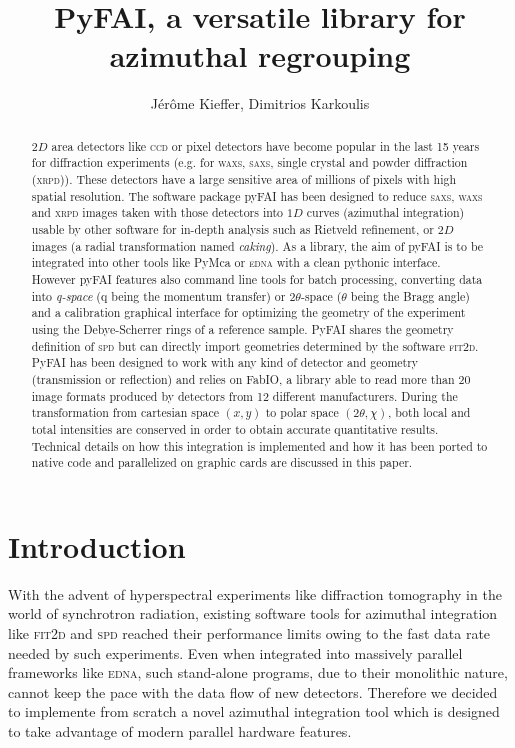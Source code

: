 \documentclass[a4paper]{jpconf}
\begin{document}
\title{PyFAI, a versatile library for azimuthal regrouping}

\author{J\'er\^ome Kieffer, Dimitrios Karkoulis}

\address{European Synchrotron Radiation Facility; 6 rue Jules Horowitz;
38043 Grenoble; France}


\begin{abstract}
$2D$ area detectors like \textsc{ccd} or pixel detectors have become popular
in the last 15 years for diffraction experiments (e.g. for \textsc{waxs},
\textsc{saxs}, single crystal and powder diffraction (\textsc{xrpd})).
These detectors have a large sensitive area of millions of pixels with  high
spatial resolution. The software package pyFAI has been designed to reduce
\textsc{saxs}, \textsc{waxs} and \textsc{xrpd} images taken with those detectors
into $1D$ curves (azimuthal integration) usable by other software for
in-depth analysis such as Rietveld refinement, or $2D$ images (a radial
transformation named \textit{caking}).
As a library, the aim of pyFAI is to be integrated into other tools like
PyMca or \textsc{edna} with a clean pythonic interface.
However pyFAI features also command line tools for batch processing, converting
data into {\em q-space} (q being the momentum transfer) or 2$\theta$-space
($\theta$ being the Bragg angle) and a calibration graphical interface for
optimizing the geometry of the experiment using the Debye-Scherrer rings of a
reference sample.
PyFAI shares the geometry definition of \textsc{spd} but can directly import
geometries determined by the software \textsc{fit2d}.
PyFAI has been designed to work with any kind of detector and geometry
(transmission or reflection) and relies on FabIO, a library able to read more
than 20 image formats produced by detectors from 12 different manufacturers.
During the transformation from cartesian space $(x,y)$ to polar
space $(2\theta, \chi )$, both local and total intensities are conserved
in order to obtain accurate quantitative results. Technical details on how this
integration is implemented and how it has been ported to native code and
parallelized on graphic cards are discussed in this paper.
\end{abstract}

\section{Introduction}

With the advent of hyperspectral experiments like diffraction tomography in the
world of synchrotron radiation, existing software tools for azimuthal
integration like \textsc{fit2d}\cite{fit2d1996} and \textsc{spd}\cite{spd} reached their
performance limits owing to the fast data rate needed by such experiments. Even
when integrated into massively parallel frameworks like
\textsc{edna}\cite{edna}, such stand-alone programs, due to their monolithic
nature, cannot keep the pace with the data flow of new detectors.
Therefore we decided to implemente from scratch a novel azimuthal integration
tool which is designed to take advantage of modern parallel hardware features.
\end{document}
